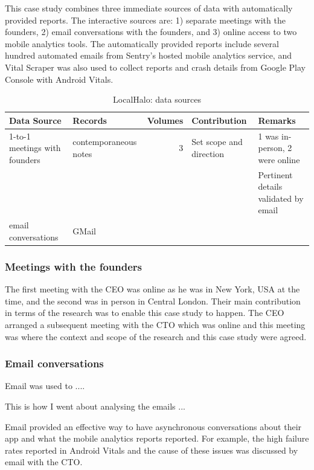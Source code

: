 This case study combines three immediate sources of data with automatically provided reports. The interactive sources are: 1) separate meetings with the founders, 2) email conversations with the founders, and 3) online access to two mobile analytics tools. The automatically provided reports include several hundred automated emails from Sentry's hosted mobile analytics service, and Vital Scraper was also used to collect reports and crash details from Google Play Console with Android Vitals.

\begin{table}
    \centering
    \begin{tabular}{llrll}
        Data Source & Records & Volumes & Contribution & Remarks \\
        \toprule
         1-to-1 meetings with founders & contemporaneous notes & 3 & Set scope and direction & 1 was in-person, 2 were online \\
         & & & & Pertinent details validated by email \\
         \midrule
         email conversations & GMail & & & \\
         \bottomrule
    \end{tabular}
    \caption{LocalHalo: data sources}
    \label{tab:localhalo-data-sources}
\end{table}

\subsubsection{Meetings with the founders}

The first meeting with the CEO was online as he was in New York, USA at the time, and the second was in person in Central London. Their main contribution in terms of the research was to enable this case study to happen. The CEO arranged a subsequent meeting with the CTO which was online and this meeting was where the context and scope of the research and this case study were agreed. 

\subsubsection{Email conversations}
Email was used to ....

This is how I went about analysing the emails ...

Email provided an effective way to have asynchronous conversations about their app and what the mobile analytics reports reported. For example, the high failure rates reported in Android Vitals and the cause of these issues was discussed by email with the CTO. 

